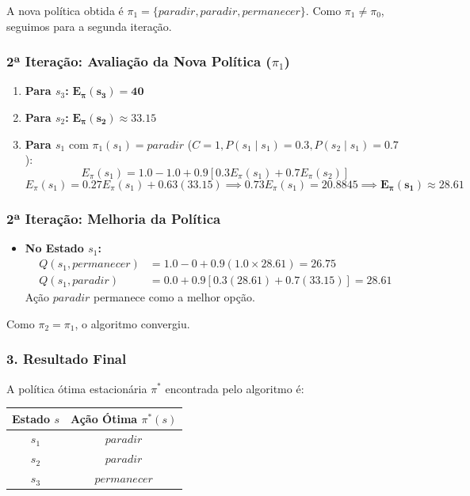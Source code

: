 \documentclass[a4paper,12pt]{article}
\begin{document}
A nova política obtida é $\pi_1 = \{\textit{paradir}, \textit{paradir}, \textit{permanecer}\}$. Como $\pi_1 \neq \pi_0$, seguimos para a segunda iteração.


\subsubsection*{2ª Iteração: Avaliação da Nova Política ($\pi_1$)}

\begin{enumerate}
	\item \textbf{Para $s_3$:} $\mathbf{E_\pi(s_3) = 40}$
	\item \textbf{Para $s_2$:} $\mathbf{E_\pi(s_2) \approx 33.15}$
	\item \textbf{Para $s_1$} com $\pi_1(s_1) = \textit{paradir}$ ($C=1, P(s_1 \mid s_1) = 0.3, P(s_2 \mid s_1) = 0.7$):
	\[
	E_\pi(s_1) = 1.0 - 1.0 + 0.9[0.3 E_\pi(s_1) + 0.7 E_\pi(s_2)]
	\]
	\[
	E_\pi(s_1) = 0.27 E_\pi(s_1) + 0.63(33.15) \implies 0.73 E_\pi(s_1) = 20.8845 \implies \mathbf{E_\pi(s_1) \approx 28.61}
	\]
\end{enumerate}

\subsubsection*{2ª Iteração: Melhoria da Política}
\begin{itemize}
	\item \textbf{No Estado $s_1$:}
	\begin{align*}
		Q(s_1, \textit{permanecer}) &= 1.0 - 0 + 0.9(1.0 \times 28.61) = \mathbf{26.75} \\
		Q(s_1, \textit{paradir}) &= 0.0 + 0.9[0.3(28.61) + 0.7(33.15)] = \mathbf{28.61}
	\end{align*}
	Ação $\textit{paradir}$ permanece como a melhor opção.
\end{itemize}

Como $\pi_2 = \pi_1$, o algoritmo convergiu.

\subsubsection*{3. Resultado Final}

A política ótima estacionária $\pi^*$ encontrada pelo algoritmo é:

\begin{table}[h!]
	\centering
	\begin{tabular}{|c|c|}
		\hline
		\textbf{Estado $s$} & \textbf{Ação Ótima $\pi^*(s)$} \\ \hline
		$s_1$ & $\textit{paradir}$ \\ \hline
		$s_2$ & $\textit{paradir}$ \\ \hline
		$s_3$ & $\textit{permanecer}$ \\ \hline
	\end{tabular}
\end{table}
\end{document}

